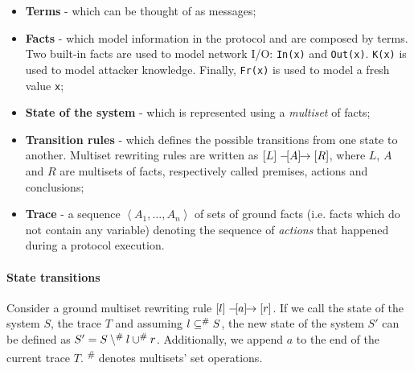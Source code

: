 \lstset{language=tamarin}
\begin{itemize}
    \item{\textbf{Terms} - which can be thought of as messages;}
    \item{\textbf{Facts} - which model information in the protocol and are composed by terms. Two built-in facts are used to model network I/O: \lstinline{In(x)} and \lstinline{Out(x)}. \lstinline{K(x)} is used to model attacker knowledge. Finally, \lstinline{Fr(x)} is used to model a fresh value \lstinline{x};}
    \item{\textbf{State of the system} - which is represented using a \textit{multiset} of facts;}
    \item{\textbf{Transition rules} - which defines the possible transitions from one state to another. Multiset rewriting rules are written as $\left[L\right] \mathrel{-\hspace{-2pt}[A]\hspace{-4pt}\to} \left[R\right]$, where $L$, $A$ and $R$ are multisets of facts, respectively called premises, actions and conclusions;}
    \item{\textbf{Trace} - a sequence $\left<A_1, \dots, A_n\right>$ of sets of ground facts (i.e. facts which do not contain any variable) denoting the sequence of \textit{actions} that happened during a protocol execution.}
\end{itemize}

\paragraph{State transitions}
Consider a ground multiset rewriting rule $\left[l\right] \mathrel{-\hspace{-2pt}[a]\hspace{-4pt}\to} \left[r\right]$. If we call the state of the system $S$, the trace $T$ and assuming $l \subseteq^\# S$, the new state of the system $S'$ can be defined as $S' = S \setminus^\# l \cup^\# r$. Additionally, we append $a$ to the end of the current trace $T$. \textsuperscript{\#} denotes multisets' set operations.





